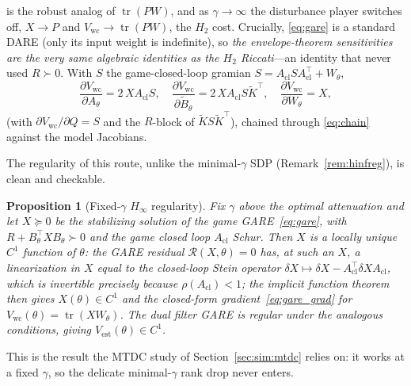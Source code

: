 \documentclass[twocolumn,amsthm]{autart}
\newtheorem{proposition}{Proposition}
\begin{document}
is the robust analog of $\operatorname{tr}(PW)$, and as $\gamma\!\to\!\infty$ the
disturbance player switches off, $X\!\to\!P$ and $V_{\mathrm{wc}}\!\to\!\operatorname{tr}(PW)$,
the $H_2$ cost. Crucially, \eqref{eq:gare} is a standard DARE (only its input
weight is indefinite), so \emph{the envelope-theorem sensitivities are the very
same algebraic identities as the $H_2$ Riccati}---an identity that never used
$R\succ0$. With $S$ the game-closed-loop gramian
$S=A_{\mathrm{cl}}SA_{\mathrm{cl}}^\top+W_\theta$,
\begin{equation}\label{eq:gare_grad}
\frac{\partial V_{\mathrm{wc}}}{\partial A_\theta}=2\,X A_{\mathrm{cl}}S,\quad
\frac{\partial V_{\mathrm{wc}}}{\partial \tilde B_\theta}=2\,X A_{\mathrm{cl}}S\tilde K^\top,\quad
\frac{\partial V_{\mathrm{wc}}}{\partial W_\theta}=X,
\end{equation}
(with $\partial V_{\mathrm{wc}}/\partial Q=S$ and the $R$-block of $\tilde K S\tilde K^\top$),
chained through \eqref{eq:chain} against the model Jacobians.

The regularity of this route, unlike the minimal-$\gamma$ SDP
(Remark~\ref{rem:hinfreg}), is clean and checkable.

\begin{proposition}[Fixed-$\gamma$ $H_\infty$ regularity]\label{prop:hinfreg}
Fix $\gamma$ above the optimal attenuation and let $X\succeq0$ be the stabilizing
solution of the game GARE~\eqref{eq:gare}, with $R+B_\theta^\top XB_\theta\succ0$
and the game closed loop $A_{\mathrm{cl}}$ Schur. Then $X$ is a locally unique
$C^1$ function of $\theta$: the GARE residual $\mathcal R(X,\theta)=0$ has, at such
an $X$, a linearization in $X$ equal to the closed-loop Stein operator
$\delta X\mapsto\delta X-A_{\mathrm{cl}}^\top\delta X A_{\mathrm{cl}}$, which is
invertible precisely because $\rho(A_{\mathrm{cl}})<1$; the implicit function
theorem then gives $X(\theta)\in C^1$ and the closed-form
gradient~\eqref{eq:gare_grad} for $V_{\mathrm{wc}}(\theta)=\operatorname{tr}(XW_\theta)$.
The dual filter GARE is regular under the analogous conditions, giving
$V_{\mathrm{est}}(\theta)\in C^1$.
\end{proposition}

This is the result the MTDC study of Section~\ref{sec:sim:mtdc} relies on: it
works at a fixed $\gamma$, so the delicate minimal-$\gamma$ rank drop never enters.
\end{document}
